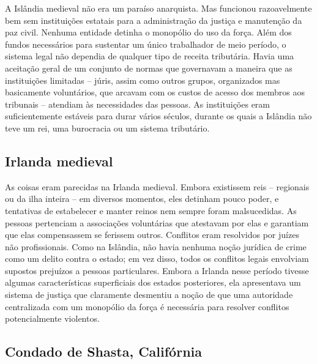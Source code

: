 A Islândia medieval não era um paraíso anarquista. Mas funcionou razoavelmente bem sem instituições estatais para a administração da justiça e manutenção da paz civil. Nenhuma entidade detinha o monopólio do uso da força. Além dos fundos necessários para sustentar um único trabalhador de meio período, o sistema legal não dependia de qualquer tipo de receita tributária. Havia uma aceitação geral de um conjunto de normas que governavam a maneira que as instituições limitadas -- júris, assim como outros grupos, organizados mas basicamente voluntários, que arcavam com os custos de acesso dos membros aos tribunais -- atendiam às necessidades das pessoas. As instituições eram suficientemente estáveis para durar vários séculos, durante os quais a Islândia não teve um rei, uma burocracia ou um sistema tributário.

\subsection*{Irlanda medieval}

As coisas eram parecidas na Irlanda medieval. Embora existissem reis -- regionais ou da ilha inteira -- em diversos momentos, eles detinham pouco poder, e tentativas de estabelecer e manter reinos nem sempre foram malsucedidas. As pessoas pertenciam a associações voluntárias que atestavam por elas e garantiam que elas compensassem se ferissem outros. Conflitos eram resolvidos por juízes não profissionais. Como na Islândia, não havia nenhuma noção jurídica de crime como um delito contra o estado; em vez disso, todos os conflitos legais envolviam supostos prejuízos a pessoas particulares. Embora a Irlanda nesse período tivesse algumas características superficiais dos estados posteriores, ela apresentava um sistema de justiça que claramente desmentiu a noção de que uma autoridade centralizada com um monopólio da força é necessária para resolver conflitos potencialmente violentos.

\subsection*{Condado de Shasta, Califórnia}

